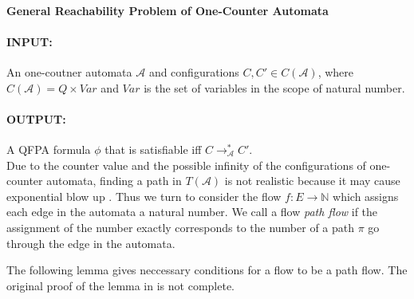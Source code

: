 \documentclass[12pt]{article}
\begin{document}
\paragraph{General Reachability Problem of One-Counter Automata}

\paragraph{INPUT:} An one-coutner automata $\mathcal{A}$ and configurations $C, C'\in C(\mathcal{A})$, where $C(\mathcal{A}) = Q \times Var$ and $Var$ is the set of variables in the scope of natural number.

\paragraph{OUTPUT:} A QFPA formula $\phi$ that is satisfiable iff $C \rightarrow^*_\mathcal{A} C'$.\\

Due to the counter value and the possible infinity of the configurations of one-counter automata, finding a path in $T(\mathcal{A})$ is not realistic because it may cause exponential blow up \cite{DBLP:conf/icalp/ChistikovH17}. Thus we turn to consider the flow $f: E \rightarrow \mathbb{N}$ which assigns each edge in the automata a natural number. We call a flow \textit{path flow } if the assignment of the number exactly corresponds to the number of a path $\pi$ go through the edge in the automata. 

The following lemma gives neccessary conditions for a flow to be a path flow. The original proof of the lemma in \cite{DBLP:conf/icalp/ChistikovH17} is not complete.
\end{document}

